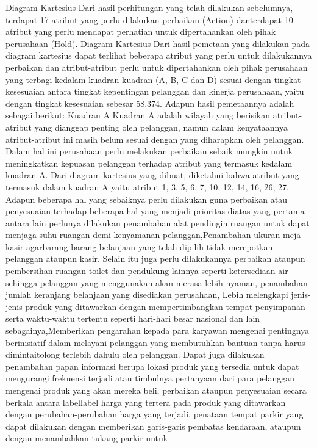 Diagram Kartesius
Dari hasil perhitungan yang telah dilakukan sebelumnya, terdapat 17 atribut yang perlu dilakukan perbaikan (Action) danterdapat 10 atribut yang perlu mendapat
perhatian untuk dipertahankan oleh pihak perusahaan (Hold). Diagram Kartesius Dari hasil pemetaan yang dilakukan pada diagram kartesius dapat terlihat beberapa
atribut yang perlu untuk dilakukannya perbaikan dan atribut-atribut perlu untuk dipertahankan oleh pihak perusahaan yang terbagi kedalam kuadran-kuadran (A, B, C
dan D) sesuai dengan tingkat kesesuaian antara tingkat kepentingan pelanggan dan kinerja perusahaan, yaitu dengan tingkat kesesuaian sebesar 58.374.
Adapun hasil pemetaannya adalah sebagai berikut:
Kuadran A
Kuadran A adalah wilayah yang berisikan atribut-atribut yang dianggap penting oleh pelanggan, namun dalam kenyataannya atribut-atribut ini masih belum sesuai
dengan yang diharapkan oleh pelanggan. Dalam hal ini perusahaan perlu melakukan perbaikan sebaik mungkin untuk meningkatkan kepuasan pelanggan terhadap
atribut yang termasuk kedalam kuadran A. Dari diagram kartesius yang dibuat, diketahui bahwa atribut yang termasuk dalam kuadran A yaitu atribut 1, 3, 5, 6, 7,
10, 12, 14, 16, 26, 27.
Adapun beberapa hal yang sebaiknya perlu dilakukan guna perbaikan atau penyesuaian terhadap beberapa hal yang menjadi  prioritas diatas yang pertama antara lain
perlunya dilakukan penambahan alat pendingin ruangan untuk dapat menjaga suhu ruangan demi kenyamanan pelanggan,Penambahan ukuran meja kasir agarbarang-barang belanjaan yang telah dipilih
tidak merepotkan pelanggan ataupun kasir. Selain itu juga perlu dilakukannya perbaikan ataupun pembersihan ruangan toilet dan pendukung lainnya seperti ketersediaan air
sehingga pelanggan yang menggunakan akan merasa lebih nyaman, penambahan jumlah keranjang belanjaan yang disediakan perusahaan, Lebih melengkapi jenis-jenis
produk yang ditawarkan dengan mempertimbangkan tempat penyimpanan serta waktu-waktu tertentu seperti hari-hari besar nasional dan lain sebagainya,Memberikan pengarahan kepada para
karyawan mengenai pentingnya berinisiatif dalam melayani pelanggan yang membutuhkan bantuan tanpa harus dimintaitolong terlebih dahulu oleh pelanggan.
Dapat juga dilakukan penambahan papan informasi berupa lokasi produk yang tersedia untuk dapat mengurangi frekuensi terjadi atau timbulnya pertanyaan dari para
pelanggan mengenai produk yang akan mereka beli, perbaikan ataupun penyesuaian secara berkala antara labellabel harga yang tertera pada produk yang ditawarkan dengan perubahan-perubahan
harga yang terjadi, penataan tempat parkir yang dapat dilakukan dengan memberikan garis-garis pembatas kendaraan, ataupun dengan menambahkan tukang parkir untuk
